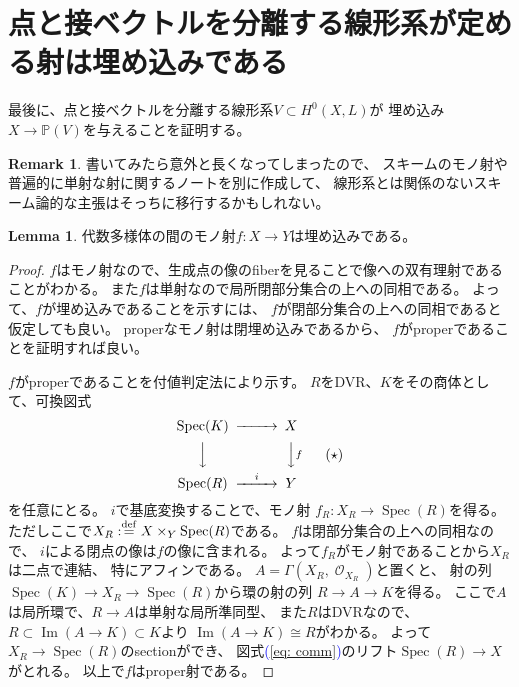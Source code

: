 \documentclass[uplatex]{jsarticle}
\renewcommand{\eqref}[1]{\textcolor{blue}{(\ref{#1})}}
\theoremstyle{definition}
\newtheorem{lem}[lem]{Lemma}
\newtheorem{rem}[rem]{Remark}
\DeclareMathOperator{\im}{\mathrm{Im}}
\DeclareMathOperator{\Spec}{\mathrm{Spec}}
\renewcommand{\P}{\mathbb{P}}
\newcommand{\mcO}{\mathcal{O}}
\DeclareMathOperator{\OOO}{\mcO}
\newcommand{\OO}[1]{\OOO_{#1}}
\newcommand{\dfn}{:\overset{\mathrm{\scriptsize def}}{=}}
\begin{document}
\section{点と接ベクトルを分離する線形系が定める射は埋め込みである}


最後に、点と接ベクトルを分離する線形系\(V\subset H^0(X,L)\)が
埋め込み\(X\to \P(V)\)を与えることを証明する。

\begin{rem}
  書いてみたら意外と長くなってしまったので、
  スキームのモノ射や普遍的に単射な射に関するノートを別に作成して、
  線形系とは関係のないスキーム論的な主張はそっちに移行するかもしれない。
\end{rem}




\begin{lem}\label{lem: mono var}
  代数多様体の間のモノ射\(f:X\to Y\)は埋め込みである。
\end{lem}


\begin{proof}
  \(f\)はモノ射なので、生成点の像のfiberを見ることで像への双有理射であることがわかる。
  また\(f\)は単射なので局所閉部分集合の上への同相である。
  よって、\(f\)が埋め込みであることを示すには、
  \(f\)が閉部分集合の上への同相であると仮定しても良い。
  properなモノ射は閉埋め込みであるから、
  \(f\)がproperであることを証明すれば良い。

  \(f\)がproperであることを付値判定法により示す。
  \(R\)をDVR、\(K\)をその商体として、可換図式
  \begin{equation}\label{eq: comm}
    \begin{CD}
      \Spec(K) @>>> X \\
      @VVV @VVfV \\
      \Spec(R) @>i>> Y
    \end{CD}
    \tag{\(\star\)}
  \end{equation}
  を任意にとる。
  \(i\)で基底変換することで、モノ射
  \(f_R:X_R\to \Spec(R)\)を得る。
  ただしここで\(X_R\dfn X\times_Y\Spec(R)\)である。
  \(f\)は閉部分集合の上への同相なので、
  \(i\)による閉点の像は\(f\)の像に含まれる。
  よって\(f_R\)がモノ射であることから\(X_R\)は二点で連結、
  特にアフィンである。
  \(A=\Gamma(X_R,\OO{X_R})\)と置くと、
  射の列\(\Spec(K)\to X_R\to \Spec(R)\)から環の射の列
  \(R\to A\to K\)を得る。
  ここで\(A\)は局所環で、\(R\to A\)は単射な局所準同型、
  また\(R\)はDVRなので、\(R\subset \im(A\to K)\subset K\)より
  \(\im(A\to K)\cong R\)がわかる。
  よって\(X_R\to \Spec(R)\)のsectionができ、
  図式\eqref{eq: comm}のリフト\(\Spec(R)\to X\)がとれる。
  以上で\(f\)はproper射である。
\end{proof}
\end{document}
